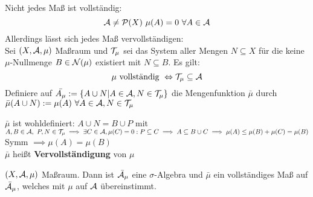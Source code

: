   \begin{remark}
    Nicht jedes Maß ist vollständig:
    \[
      \script{A} \neq \script{P}(X) \ \mu(A) = 0 \ \forall A \in \script{A}
    \]
    Allerdings lässt sich jedes Maß vervollständigen:\\
    Sei $(X, \mathcal{A}, \mu)$ Maßraum und $\mathcal{T}_{\mu}$ sei das System aller Mengen $N \subseteq X$ für die keine $\mu$-Nullmenge $B \in \mathcal{N}(\mu)$ existiert mit $N \subseteq B$. Es gilt:\\
    \[
      \mu \text{ vollständig } \Leftrightarrow \mathcal{T}_{\mu} \subseteq \mathcal{A}
    \]
    Definiere auf $\bar{A_{\mu}} := \{A \cup N | A \in \mathcal{A}, N \in \mathcal{T}_{\mu}\}$ die Mengenfunktion $\bar{\mu}$ durch $\bar{\mu}(A\cup N) := \mu(A) \ \forall A \in \mathcal{A}, N\in \mathcal{T}_{\mu}$
  \end{remark}

  \begin{remark}
    $\bar{\mu}$ ist wohldefiniert: $A \cup N = B \cup P$ mit $A,B\in \mathcal{A}, \ P,N \in \mathcal{T}_{\mu} \implies \exists C \in \mathcal{A}, \mu(C) = 0: P \subseteq C \implies A \subseteq B \cup C \implies \mu(A) \leq \mu(B) + \mu(C) = \mu(B)$\\
    Symm $\implies \mu(A) = \mu(B)$\\
    $\bar{\mu}$ heißt \textbf{Vervollständigung} von $\mu$
  \end{remark}

  \begin{theorem}
    $(X,\mathcal{A}, \mu)$ Maßraum. Dann ist $\bar{\mathcal{A}}_{\mu}$ eine $\sigma$-Algebra und $\bar{\mu}$ ein vollständiges Maß auf $\bar{\mathcal{A}}_{\mu}$, welches mit $\mu$ auf $\mathcal{A}$ übereinstimmt.
  \end{theorem}


